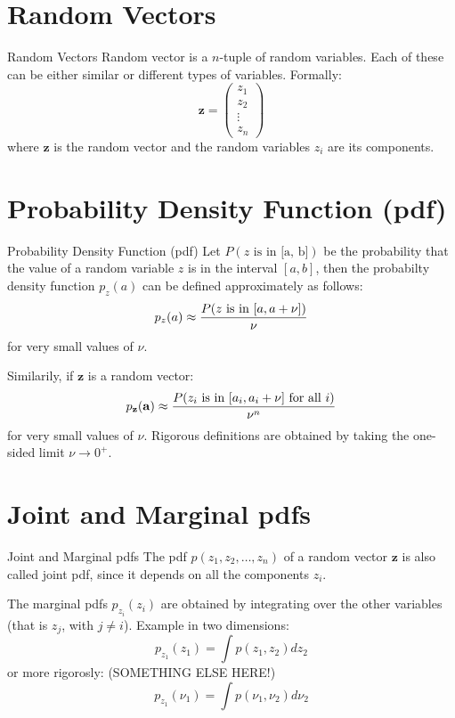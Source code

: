 \documentclass{beamer}
\begin{document}
\section{Random Vectors}

\begin{frame}{Random Vectors}
  Random vector is a $n$-tuple of random variables. Each of these can be either
  similar or different types of variables. Formally:
  \[ \mathbf{z} =  \begin{pmatrix} z_1 \\ z_2 \\ \vdots \\ z_n \end{pmatrix} \]
  where $\mathbf{z}$ is the random vector and the random variables $z_i$ are
  its components.
\end{frame}

\section{Probability Density Function (pdf)}

\begin{frame}{Probability Density Function (pdf)}
  Let $P(\text{$z$ is in [a, b]})$ be the probability that the value of a
  random variable $z$ is in the interval $[a, b]$, then the probabilty density
  function $p_z(a)$ can be defined approximately as follows:
  \[ p_z(a) \approx \frac{P(\textnormal{$z$ is in $[a, a + \nu]$})}{\nu}\]
  for very small values of $\nu$.

  Similarily, if $\mathbf{z}$ is a random vector:
  \[ p_{\mathbf{z}}(\mathbf{a}) \approx
  \frac{P(\textnormal{$z_i$ is in $[a_i, a_i + \nu]$ for all $i$})}{\nu^n}\]
  for very small values of $\nu$. Rigorous definitions are obtained by taking
  the one-sided limit $\nu \to 0^+$.
\end{frame}

\section{Joint and Marginal pdfs}

\begin{frame}{Joint and Marginal pdfs}
  The pdf $p(z_1, z_2, \ldots, z_n)$ of a random vector $\mathbf{z}$ is also
  called joint pdf, since it depends on all the components $z_i$.

  The marginal pdfs $p_{z_i}(z_i)$ are obtained by integrating over the other
  variables (that is $z_j$, with $j \ne i$). Example in two dimensions:
  \[ p_{z_1}(z_1) =  \int p(z_1, z_2)dz_2\]
  or more rigorosly: (SOMETHING ELSE HERE!)
  \[ p_{z_1}(\nu_1) =  \int p(\nu_1, \nu_2)d\nu_2\]
\end{frame}
\end{document}

